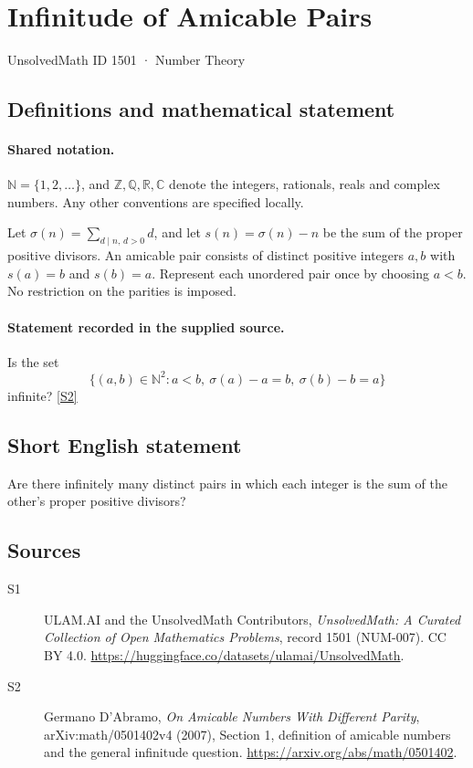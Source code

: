 \documentclass[11pt]{article}
\newcommand{\sref}[2]{\hyperlink{source:#1:#2}{[S#2]}}
\begin{document}
\setcounter{section}{1500}
\section{Infinitude of Amicable Pairs}\label{1501}
{\small\sffamily UnsolvedMath ID 1501 · Number Theory}
\subsection{Definitions and mathematical statement}

\paragraph{Shared notation.}$\mathbb N=\{1,2,\ldots\}$, and $\mathbb Z,\mathbb Q,\mathbb R,\mathbb C$ denote the integers, rationals, reals and complex numbers. Any other conventions are specified locally.


Let \(\sigma(n)=\sum_{d\mid n,\,d>0}d\), and let
\(s(n)=\sigma(n)-n\) be the sum of the proper positive divisors.
An amicable pair consists of distinct positive integers \(a,b\)
with \(s(a)=b\) and \(s(b)=a\). Represent each unordered pair
once by choosing \(a<b\). No restriction on the parities is imposed.
\paragraph{Statement recorded in the supplied source.}
Is the set
\[
 \{(a,b)\in\mathbb N^2:a<b,\ \sigma(a)-a=b,\ \sigma(b)-b=a\}
\]
infinite? \sref{1501}{2}
\subsection{Short English statement}
Are there infinitely many distinct pairs in which each integer is the sum of the other's proper positive divisors?
\subsection{Sources}
\begin{description}
\item[\hypertarget{source:1501:1}{S1}] ULAM.AI and the UnsolvedMath Contributors, \emph{UnsolvedMath: A Curated Collection of Open Mathematics Problems}, record 1501 (NUM-007). CC BY 4.0. \url{https://huggingface.co/datasets/ulamai/UnsolvedMath}.
\item[\hypertarget{source:1501:2}{S2}] Germano D'Abramo, \emph{On Amicable Numbers With Different Parity}, arXiv:math/0501402v4 (2007), Section 1, definition of amicable numbers and the general infinitude question. \url{https://arxiv.org/abs/math/0501402}.
\end{description}
\label{end:1501}
\end{document}
